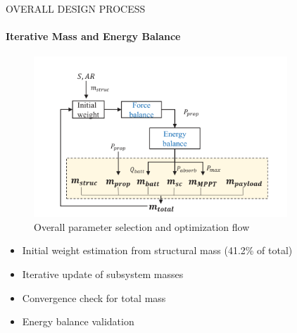\documentclass{beamer}
\begin{document}
\begin{frame}{OVERALL DESIGN PROCESS}
    \framesubtitle{Iterative Mass and Energy Balance}
    
    \begin{figure}
        \centering
        \includegraphics[width=0.85\textwidth]{design_process.png}
        \caption{Overall parameter selection and optimization flow}
    \end{figure}
    
    \begin{itemize}
        \item Initial weight estimation from structural mass (41.2\% of total)
        \item Iterative update of subsystem masses
        \item Convergence check for total mass
        \item Energy balance validation
    \end{itemize}
\end{frame}
\end{document}

